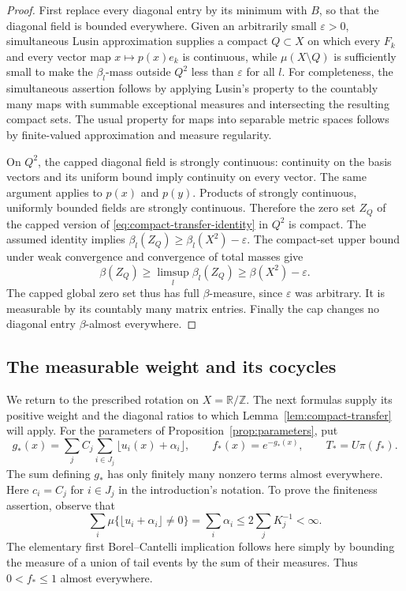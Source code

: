 \begin{proof}
First replace every diagonal entry by its minimum with $B$, so that the
diagonal field is bounded everywhere.  Given an arbitrarily small
$\varepsilon>0$, simultaneous Lusin approximation supplies a compact
$Q\subset X$ on which every $F_k$ and every vector map $x\mapsto p(x)e_k$
is continuous, while $\mu(X\setminus Q)$ is sufficiently small to make
the $\beta_l$-mass outside $Q^2$ less than $\varepsilon$ for all $l$.
For completeness, the simultaneous assertion follows by applying Lusin's
property to the countably many maps with summable exceptional measures
and intersecting the resulting compact sets.  The usual property for
maps into separable metric spaces follows by finite-valued approximation
and measure regularity.

On $Q^2$, the capped diagonal field is strongly continuous: continuity on
the basis vectors and its uniform bound imply continuity on every vector.
The same argument applies to $p(x)$ and $p(y)$.  Products of strongly
continuous, uniformly bounded fields are strongly continuous.  Therefore
the zero set $Z_Q$ of the capped version of
\eqref{eq:compact-transfer-identity} in $Q^2$ is compact.  The assumed
identity implies
$\beta_l(Z_Q)\ge\beta_l(X^2)-\varepsilon$.  The compact-set upper bound
under weak convergence and convergence of total masses give
\[
 \beta(Z_Q)\ge\limsup_l\beta_l(Z_Q)
 \ge\beta(X^2)-\varepsilon.
\]
The capped global zero set thus has full $\beta$-measure, since
$\varepsilon$ was arbitrary.  It is measurable by its countably many
matrix entries.  Finally the cap changes no diagonal entry
$\beta$-almost everywhere.
\end{proof}

\subsection{The measurable weight and its cocycles}

We return to the prescribed rotation on $X=\mathbb R/\mathbb Z$.
The next formulas supply its positive weight and the diagonal ratios
to which Lemma~\ref{lem:compact-transfer} will apply.
For the parameters of Proposition~\ref{prop:parameters}, put
\begin{equation}\label{eq:measurable-weight}
 g_*(x)=\sum_j C_j\sum_{i\in J_j}
       \lfloor u_i(x)+\alpha_i\rfloor,\qquad
 f_*(x)=e^{-g_*(x)},\qquad T_*=U\pi(f_*).
\end{equation}
The sum defining $g_*$ has only finitely many nonzero terms almost
everywhere.  Here $c_i=C_j$ for $i\in J_j$ in the introduction's notation.
To prove the finiteness assertion, observe that
\[
 \sum_i\mu\{\lfloor u_i+\alpha_i\rfloor\ne0\}
 =\sum_i\alpha_i\le2\sum_j K_j^{-1}<\infty.
\]
The elementary first Borel--Cantelli implication follows here simply by
bounding the measure of a union of tail events by the sum of their measures.
Thus $0<f_*\le1$ almost everywhere.

